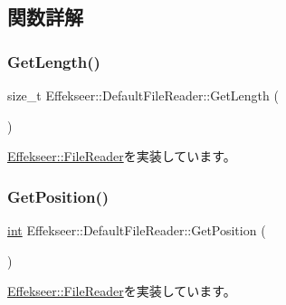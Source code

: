 \subsection{関数詳解}
\mbox{\label{class_effekseer_1_1_default_file_reader_a2663a6f3b6bf3aaabadcfe371a85b15d}} 
\subsubsection{\texorpdfstring{Get\+Length()}{GetLength()}}
{\footnotesize\ttfamily size\+\_\+t Effekseer\+::\+Default\+File\+Reader\+::\+Get\+Length (\begin{DoxyParamCaption}{ }\end{DoxyParamCaption})\hspace{0.3cm}{\ttfamily [virtual]}}



\mbox{\hyperlink{class_effekseer_1_1_file_reader_ae802d02a06437baa0ed74f1927617924}{Effekseer\+::\+File\+Reader}}を実装しています。

\mbox{\label{class_effekseer_1_1_default_file_reader_a86001f21782b7cb40a5e0ca4ee155aca}} 
\subsubsection{\texorpdfstring{Get\+Position()}{GetPosition()}}
{\footnotesize\ttfamily \mbox{\hyperlink{namespace_effekseer_ace0abf7c2e6947e519ebe8b54cbcc30a}{int}} Effekseer\+::\+Default\+File\+Reader\+::\+Get\+Position (\begin{DoxyParamCaption}{ }\end{DoxyParamCaption})\hspace{0.3cm}{\ttfamily [virtual]}}



\mbox{\hyperlink{class_effekseer_1_1_file_reader_ad69aa533374ee6661938c7a81495b6d7}{Effekseer\+::\+File\+Reader}}を実装しています。

